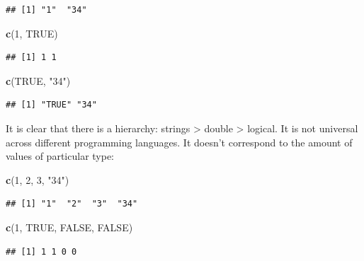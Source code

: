 \documentclass[
]{book}
\newenvironment{Shaded}{\begin{snugshade}}{\end{snugshade}}
\newcommand{\DecValTok}[1]{\textcolor[rgb]{0.00,0.00,0.81}{#1}}
\newcommand{\KeywordTok}[1]{\textcolor[rgb]{0.13,0.29,0.53}{\textbf{#1}}}
\newcommand{\NormalTok}[1]{#1}
\newcommand{\OtherTok}[1]{\textcolor[rgb]{0.56,0.35,0.01}{#1}}
\newcommand{\StringTok}[1]{\textcolor[rgb]{0.31,0.60,0.02}{#1}}
\begin{document}
\begin{verbatim}
## [1] "1"  "34"
\end{verbatim}

\begin{Shaded}
\begin{Highlighting}[]
\KeywordTok{c}\NormalTok{(}\DecValTok{1}\NormalTok{, }\OtherTok{TRUE}\NormalTok{)}
\end{Highlighting}
\end{Shaded}

\begin{verbatim}
## [1] 1 1
\end{verbatim}

\begin{Shaded}
\begin{Highlighting}[]
\KeywordTok{c}\NormalTok{(}\OtherTok{TRUE}\NormalTok{, }\StringTok{"34"}\NormalTok{)}
\end{Highlighting}
\end{Shaded}

\begin{verbatim}
## [1] "TRUE" "34"
\end{verbatim}

It is clear that there is a hierarchy: strings \textgreater{} double \textgreater{} logical. It is not universal across different programming languages. It doesn't correspond to the amount of values of particular type:

\begin{Shaded}
\begin{Highlighting}[]
\KeywordTok{c}\NormalTok{(}\DecValTok{1}\NormalTok{, }\DecValTok{2}\NormalTok{, }\DecValTok{3}\NormalTok{, }\StringTok{"34"}\NormalTok{)}
\end{Highlighting}
\end{Shaded}

\begin{verbatim}
## [1] "1"  "2"  "3"  "34"
\end{verbatim}

\begin{Shaded}
\begin{Highlighting}[]
\KeywordTok{c}\NormalTok{(}\DecValTok{1}\NormalTok{, }\OtherTok{TRUE}\NormalTok{, }\OtherTok{FALSE}\NormalTok{, }\OtherTok{FALSE}\NormalTok{)}
\end{Highlighting}
\end{Shaded}

\begin{verbatim}
## [1] 1 1 0 0
\end{verbatim}
\end{document}
